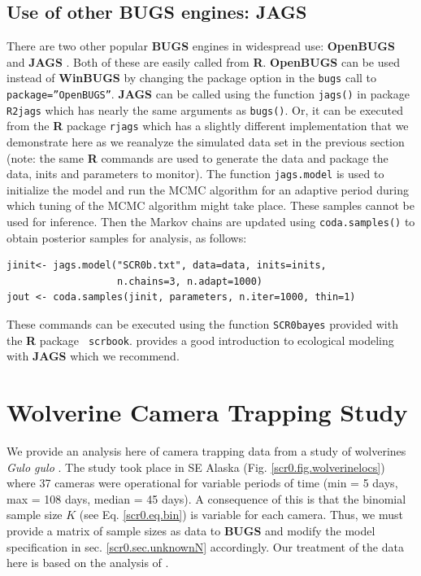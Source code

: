 \subsection{Use of other \textbf{BUGS} engines: {\bf JAGS}}

There are two other popular {\bf BUGS} engines in widespread use: {\bf
  OpenBUGS} \citep{thomas_etal:2006} and {\bf JAGS}
\citep{plummer:2003}. Both of these are easily called from {\bf
  R}. {\bf OpenBUGS} can be used instead of {\bf WinBUGS} by changing
the package option in the \mbox{\tt bugs} call to \mbox{\tt
  package=''OpenBUGS''}.  {\bf JAGS} can be called using the function
\mbox{\tt jags()} in package \mbox{\tt R2jags} which has nearly the
same arguments as \mbox{\tt bugs()}.  Or, it can be executed from
the {\bf R}
package
 \mbox{\tt rjags} \citep{plummer:2009} which has a slightly
different implementation that we demonstrate here as we reanalyze the
simulated data set in the previous section (note: the same {\bf R}
commands are used to generate the data and package the data, inits and
parameters to monitor). The function \mbox{\tt jags.model} is used to
initialize the model and run the MCMC algorithm for an adaptive period
during which tuning of the MCMC algorithm might take place.  These
samples cannot be used for inference.  Then the Markov chains are
updated using \mbox{\tt coda.samples()} to obtain posterior samples
for analysis, as follows:
{\small
\begin{verbatim}
jinit<- jags.model("SCR0b.txt", data=data, inits=inits,
                   n.chains=3, n.adapt=1000)
jout <- coda.samples(jinit, parameters, n.iter=1000, thin=1)
\end{verbatim}
}
These commands can be executed
using the function
\mbox{\tt SCR0bayes} provided with the {\bf R} package \mbox{\tt
  scrbook}. \citet{hobbs:2011} provides a good introduction to
ecological modeling with {\bf JAGS} which we recommend.



\section{Wolverine Camera Trapping Study}
\label{scr0.sec.wolverine}

We provide an analysis here of camera trapping data from a study of
wolverines \emph{Gulo gulo}
\citep{magoun_etal:2011, royle_etal:2011jwm}. The study took place in
SE Alaska (Fig. \ref{scr0.fig.wolverinelocs}) where 37 cameras were
operational for variable periods of time (min = 5 days, max = 108
days, median = 45 days).  A consequence of this is that the binomial
sample size $K$ (see Eq. \ref{scr0.eq.bin}) is variable for each
camera. Thus, we must provide a matrix of sample sizes as data to {\bf
  BUGS} and modify the model specification in
sec. %
\ref{scr0.sec.unknownN} accordingly. Our treatment of the data
here is based on the analysis of \citet{royle_etal:2011jwm}.

